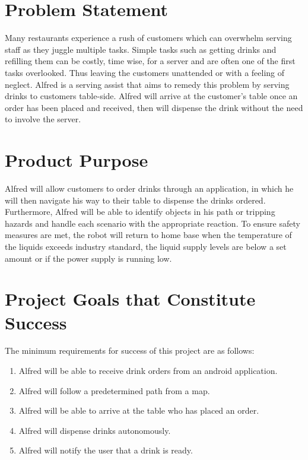 \documentclass [10pt]{article}
\begin{document}
\section{Problem Statement}

\indent\indent Many restaurants experience a rush of customers which can overwhelm serving staff as they juggle multiple tasks. Simple tasks such as getting drinks and refilling them can be costly, time wise, for a server and are often one of the first tasks overlooked. Thus leaving the customers unattended or with a feeling of neglect. Alfred is a serving assist that aims to remedy this problem by serving drinks to customers table-side. Alfred will arrive at the customer's table once an order has been placed and received, then will dispense the drink without the need to involve the server. 


\section{Product Purpose}

\indent\indent Alfred will allow customers to order drinks through an application, in which he will then navigate his way to their table to dispense the drinks ordered. Furthermore, Alfred will be able to identify objects in his path or tripping hazards and handle each scenario with the appropriate reaction. To ensure safety measures are met, the robot will return to home base when the temperature of the liquids exceeds industry standard, the liquid supply levels are below a set amount or if the power supply is running low.


\section{Project Goals that Constitute Success }
The minimum requirements for success of this project are as follows:\\

\begin{enumerate}[label=G\arabic*:, ref =\arabic*, leftmargin=0.5in]

	\item Alfred will be able to receive drink orders from an android application.
	\item Alfred will follow a predetermined path from a map.
	\item Alfred will be able to arrive at the table who has placed an order.
	\item Alfred will dispense drinks autonomously.
	\item Alfred will notify the user that a drink is ready.
	
\end{enumerate}
\end{document}

